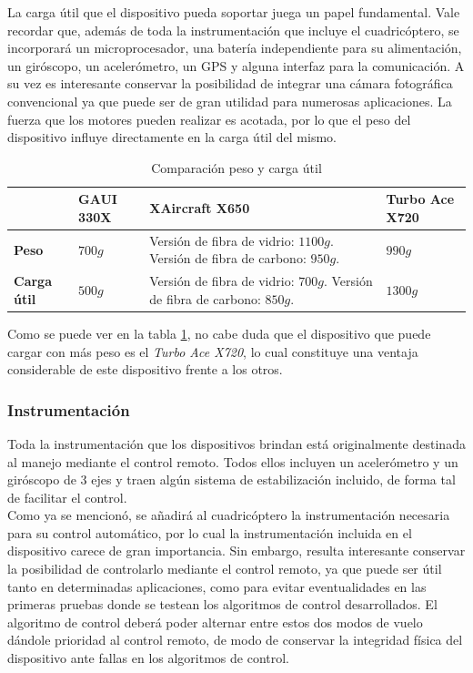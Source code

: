 \documentclass[main]{subfiles}
\begin{document}
	La carga \'util que el dispositivo pueda soportar juega un papel fundamental. Vale recordar que, adem\'as de toda la instrumentaci\'on que incluye el cuadric\'optero, se incorporar\'a un microprocesador, una bater\'ia independiente para su alimentaci\'on, un gir\'oscopo, un aceler\'ometro, un GPS y alguna interfaz para la comunicaci\'on. A su vez es interesante conservar la posibilidad de integrar una c\'amara fotogr\'afica convencional ya que puede ser de gran utilidad para numerosas aplicaciones. La fuerza que los motores pueden realizar es acotada, por lo que el peso del dispositivo influye directamente en la carga \'util del mismo.

\begin{table}[H]
\begin{tabular}{p{40pt}|p{70pt}|p{160pt}|p{110pt}|} 
\cline{2-4}
& \cellcolor[gray]{0.8} \textbf{GAUI 330X} 
& \cellcolor[gray]{0.8} \textbf{XAircraft X650} 
& \cellcolor[gray]{0.8} \textbf{Turbo Ace X720} \\ \cline{2-4} \hline
\multicolumn{1}{|p{40pt}|}{\cellcolor[gray]{0.8}\textbf{Peso}} 
& $700g$ & Versi\'on de fibra de vidrio: $1100g$. Versi\'on de fibra de carbono: $950g$. & $990g$ \\ \hline
\multicolumn{1}{|p{40pt}|}{\cellcolor[gray]{0.8}\textbf{Carga \'util}} 
& $500g$ & Versi\'on de fibra de vidrio: $700g$. Versi\'on de fibra de carbono: $850g$. & $1300 g$ \\ 
\hline 
\end{tabular}
\caption{Comparaci\'on peso y carga \'util}
\label{tab:peso}
\end{table}

Como se puede ver en la tabla \ref{tab:peso}, no cabe duda que el dispositivo que puede cargar con m\'as peso es el \emph{Turbo Ace X720}, lo cual constituye una ventaja considerable de este dispositivo frente a los otros.

\subsubsection*{Instrumentaci\'on}

	Toda la instrumentaci\'on que los dispositivos brindan est\'a originalmente destinada al manejo mediante el control remoto. Todos ellos incluyen un aceler\'ometro y un gir\'oscopo de 3 ejes y traen alg\'un sistema de estabilizaci\'on incluido, de forma tal de facilitar el control. \\

	Como ya se mencion\'o, se a\~nadir\'a al cuadric\'optero la instrumentaci\'on necesaria para su control autom\'atico, por lo cual la instrumentaci\'on incluida en el dispositivo carece de gran importancia. Sin embargo, resulta interesante conservar la posibilidad de controlarlo mediante el control remoto, ya que puede ser \'util tanto en determinadas aplicaciones, como para evitar eventualidades en las primeras pruebas donde se testean los algoritmos de control desarrollados. El algoritmo de control deber\'a poder alternar entre estos dos modos de vuelo d\'andole prioridad al control remoto, de modo de conservar la integridad f\'isica del dispositivo ante fallas en los algoritmos de control.
\end{document}
